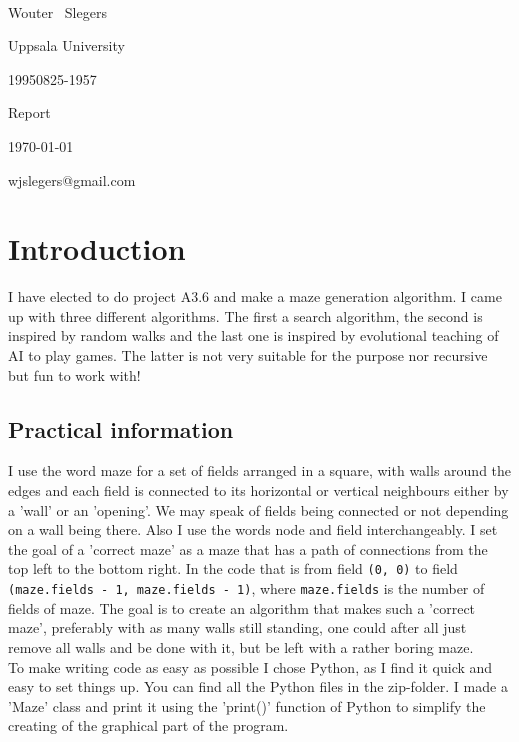 \documentclass[10pt, a4paper, twoside]{amsart}
\makeatletter
\newcommand{\1}{\mathbbm{1}}
\newcommand\textbox[1]{
  \parbox{.333\textwidth}{#1}}
\newcommand{\courseName} {A3.6 Maze Generation}
\newcommand{\firstName}  {Wouter}
\newcommand{\lastName}   {Slegers}
\newcommand{\studId}     {19950825-1957}
\renewcommand{\email}    {wjslegers@gmail.com}
\makeatother
\begin{document}
\noindent{\huge\bf \courseName}\\
\noindent\textbox{\sc \firstName~ \lastName \hfill}\textbox{\hfil Uppsala University \hfil}\textbox{\hfill \studId}
\noindent\textbox{\large\sc Report \hfill}\textbox{\hfil \today \hfil}\textbox{\hfill \email}
\bigskip


\section*{Introduction}
I have elected to do project A3.6 and make a maze generation algorithm. I came up with three different algorithms. The first a search algorithm, the second is inspired by random walks and the last one is inspired by evolutional teaching of AI to play games. The latter is not very suitable for the purpose nor recursive but fun to work with!

\subsection*{Practical information}
I use the word maze for a set of fields arranged in a square, with walls around the edges and each field is connected to its horizontal or vertical neighbours either by a 'wall' or an 'opening'. We may speak of fields being connected or not depending on a wall being there. Also I use the words node and field interchangeably.
I set the goal of a 'correct maze' as a maze that has a path of connections from the top left to the bottom right. In the code that is from field \verb+(0, 0)+ to field \verb+(maze.fields - 1, maze.fields - 1)+, where \verb+maze.fields+ is the number of fields of maze. The goal is to create an algorithm that makes such a 'correct maze', preferably with as many walls still standing, one could after all just remove all walls and be done with it, but be left with a rather boring maze.\\

To make writing code as easy as possible I chose Python, as I find it quick and easy to set things up. 
You can find all the Python files in the zip-folder.
I made a 'Maze' class and print it using the 'print()' function of Python to simplify the creating of the graphical part of the program.
\end{document}
